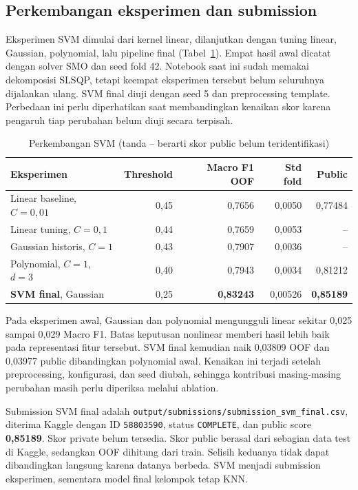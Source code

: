 \subsection{Perkembangan eksperimen dan submission}
Eksperimen SVM dimulai dari kernel linear, dilanjutkan dengan tuning linear, Gaussian, polynomial, lalu pipeline final (Tabel~\ref{tab:svm_history}). Empat hasil awal dicatat dengan solver SMO dan seed fold 42. Notebook saat ini sudah memakai dekomposisi SLSQP, tetapi keempat eksperimen tersebut belum seluruhnya dijalankan ulang. SVM final diuji dengan seed 5 dan preprocessing template. Perbedaan ini perlu diperhatikan saat membandingkan kenaikan skor karena pengaruh tiap perubahan belum diuji secara terpisah.
\begin{table}[H]
\centering
\caption{Perkembangan SVM (tanda -- berarti skor public belum teridentifikasi)}
\label{tab:svm_history}
\begin{tabular}{lrrrr}
\toprule
Eksperimen & Threshold & Macro F1 OOF & Std fold & Public \\
\midrule
Linear baseline, $C=0{,}01$ & 0,45 & 0,7656 & 0,0050 & 0,77484 \\
Linear tuning, $C=0{,}1$ & 0,44 & 0,7659 & 0,0053 & -- \\
Gaussian historis, $C=1$ & 0,43 & 0,7907 & 0,0036 & -- \\
Polynomial, $C=1$, $d=3$ & 0,40 & 0,7943 & 0,0034 & 0,81212 \\
\textbf{SVM final}, Gaussian & 0,25 & \textbf{0,83243} & 0,00526 & \textbf{0,85189} \\
\bottomrule
\end{tabular}
\end{table}
Pada eksperimen awal, Gaussian dan polynomial mengungguli linear sekitar 0,025 sampai 0,029 Macro F1. Batas keputusan nonlinear memberi hasil lebih baik pada representasi fitur tersebut. SVM final kemudian naik 0,03809 OOF dan 0,03977 public dibandingkan polynomial awal. Kenaikan ini terjadi setelah preprocessing, konfigurasi, dan seed diubah, sehingga kontribusi masing-masing perubahan masih perlu diperiksa melalui ablation.

Submission SVM final adalah \texttt{output/submissions/submission\_svm\_final.csv}, diterima Kaggle dengan ID \texttt{58803590}, status \texttt{COMPLETE}, dan public score \textbf{0,85189}. Skor private belum tersedia.
Skor public berasal dari sebagian data test di Kaggle, sedangkan OOF dihitung dari train. Selisih keduanya tidak dapat dibandingkan langsung karena datanya berbeda. SVM menjadi submission eksperimen, sementara model final kelompok tetap KNN.

